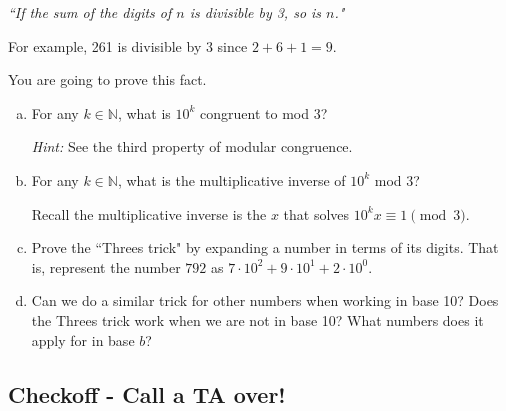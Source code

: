 \documentclass[12pt,letterpaper]{article}
\newcommand\N{\mathbb N}
\begin{document}
		\textit{``If the sum of the digits of $n$ is divisible by 3, so is $n$."}

		For example, 261 is divisible by 3 since $2+6+1 = 9$.

		You are going to prove this fact.

		\begin{enumerate}[a.]
			\item For any $k \in \N$, what is $10^k$ congruent to mod 3?
			
			\textit{Hint:} See the third property of modular congruence.

			\begin{mdframed} \vspace{1cm} \end{mdframed}

			\item For any $k \in \N$, what is the multiplicative inverse of $10^k$ mod 3?

			Recall the multiplicative inverse is the $x$ that solves $10^k x\equiv 1 \pmod 3$.

			\begin{mdframed} \vspace{1cm} \end{mdframed}

			\item Prove the ``Threes trick" by expanding a number in terms of its digits. That is, represent the number $792$ as $7 \cdot 10^2 + 9 \cdot 10^1 + 2 \cdot 10^0$.
			
			\begin{mdframed} \vspace{4cm} \end{mdframed}

			\item Can we do a similar trick for other numbers when working in base 10? Does the Threes trick work when we are not in base 10? What numbers does it apply for in base $b$?
			
			\begin{mdframed} \vspace{1cm} \end{mdframed}
			
		\end{enumerate}

   \subsection*{Checkoff - Call a TA over!}
\end{document}
